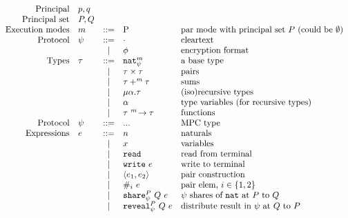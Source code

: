 \documentclass[10pt]{article}
\newcommand{\kw}[1]{\ensuremath{\mathtt{#1}}}
\newcommand{\tnat}{\ensuremath{\mathtt{nat}}}
\newcommand{\tfun}[3]{\ensuremath{{#1} ~^{#3}\!\rightarrow {#2}}}
\newcommand{\tpair}[2]{\ensuremath{{#1} \times {#2}}}
\newcommand{\tsum}[3]{\ensuremath{{#1} +^{#3} {#2}}}
\newcommand{\trec}[2]{\ensuremath{\mu {#1}.{#2}}}
\newcommand{\ereveal}[4]{\ensuremath{\kw{reveal}^{#1}_{#4}~{#2}~{#3}}}
\newcommand{\eshare}[4]{\ensuremath{\kw{share}^{#2}_{#1}~{#3}~{#4}}}
\newcommand{\eread}{\ensuremath{\kw{read}}}
\newcommand{\ewrite}[1]{\ensuremath{\kw{write}~{#1}}}
\newcommand{\epair}[2]{\ensuremath{\langle {#1}, {#2} \rangle}}
\newcommand{\eproj}[2]{\ensuremath{\kw{\#}}_{#1}~{#2}}
\begin{document}
\begin{figure}[h]
  \centering
  \[\begin{array}{rlcll}
      \text{Principal} & p, q \\
      \text{Principal set} & P, Q \\
    \text{Execution modes} & m  & ::=  & $P$ & \text{par mode with principal set $P$ (could be $\emptyset$)} \\
      \text{Protocol} & \psi & ::= & \cdot & \text{cleartext} \\
                       && \mid & \phi & \text{encryption format} \\
      \text{Types} & \tau & ::=  & \tnat^m_\psi & \text{a base type} \\
                       && \mid & \tpair{\tau}{\tau} & \text{pairs} \\
                       && \mid & \tsum{\tau}{\tau}{m} & \text{sums} \\
                       && \mid & \trec{\alpha}{\tau} & \text{(iso)recursive types} \\
                       && \mid & \alpha & \text{type variables (for recursive types)} \\
                       && \mid & \tfun{\tau}{\tau}{m} & \text{functions} \\
      \text{Protocol} & \psi & ::= & ... & \text{MPC type} \\
      \text{Expressions} & e & ::= & n & \text{naturals} \\
                       && \mid & x & \text{variables} \\
                       && \mid & \eread & \text{read from terminal}\\
                       && \mid & \ewrite{e} & \text{write to terminal}\\
                       && \mid & \epair{e_1}{e_2} & \text{pair construction}\\
                       && \mid & \eproj{i}{e} & \text{pair elem, }i \in \{1,2\}\\
                       && \mid & \eshare{\psi}{P}{Q}{e} & \text{$\psi$ shares of {\tnat} at $P$ to $Q$} \\
                       && \mid & \ereveal{P}{Q}{e}{\psi} & \text{distribute result in $\psi$ at $Q$ to $P$}\\

\end{array}\]
\end{figure}
\end{document}
